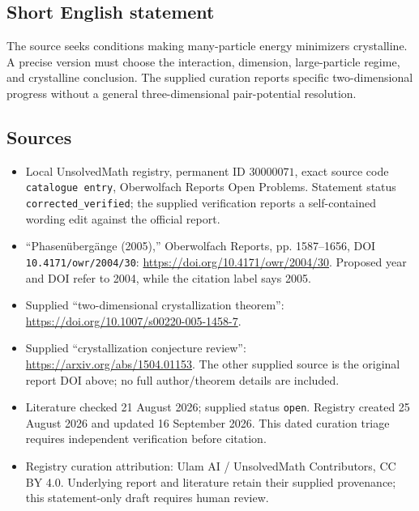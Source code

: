 \documentclass[11pt]{article}
\begin{document}
\subsection{Short English statement}
The source seeks conditions making many-particle energy minimizers crystalline. A precise version must choose the interaction, dimension, large-particle regime, and crystalline conclusion. The supplied curation reports specific two-dimensional progress without a general three-dimensional pair-potential resolution.
\subsection{Sources}
\begin{itemize}
\item Local UnsolvedMath registry, permanent ID \(30000071\), exact source code \texttt{catalogue entry}, Oberwolfach Reports Open Problems. Statement status \texttt{corrected\_verified}; the supplied verification reports a self-contained wording edit against the official report.
\item ``Phasen\"uberg\"ange (2005),'' Oberwolfach Reports, pp. 1587--1656, DOI \texttt{10.4171/owr/2004/30}: \url{https://doi.org/10.4171/owr/2004/30}. Proposed year and DOI refer to 2004, while the citation label says 2005.
\item Supplied ``two-dimensional crystallization theorem'': \url{https://doi.org/10.1007/s00220-005-1458-7}.
\item Supplied ``crystallization conjecture review'': \url{https://arxiv.org/abs/1504.01153}. The other supplied source is the original report DOI above; no full author/theorem details are included.
\item Literature checked 21 August 2026; supplied status \texttt{open}. Registry created 25 August 2026 and updated 16 September 2026. This dated curation triage requires independent verification before citation.
\item Registry curation attribution: Ulam AI / UnsolvedMath Contributors, CC BY 4.0. Underlying report and literature retain their supplied provenance; this statement-only draft requires human review.
\end{itemize}
\end{document}
